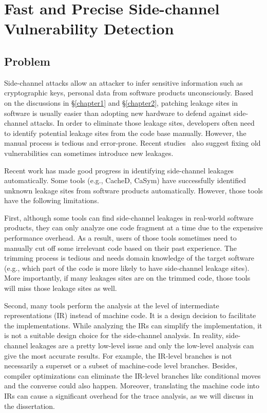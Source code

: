 
\chapter{Fast and Precise Side-channel Vulnerability Detection}\label{chapter3}
\section{Problem}
Side-channel attacks allow an attacker to infer sensitive information such as cryptographic keys, personal data from software products unconsciously. Based on the discussions in \S\ref{chapter1} and \S\ref{chapter2}, patching leakage sites in software is usually easier than adopting new hardware to defend against side-channel attacks. In order to eliminate those leakage sites, developers often need to identify potential leakage sites from the code base manually. However, the manual process is tedious and error-prone. Recent studies~\cite{203878} also suggest fixing old vulnerabilities can sometimes introduce new leakages.

Recent work has made good progress in identifying side-channel leakages automatically. Some tools (e.g., CacheD, CaSym) have successfully identified unknown leakage sites from software products automatically. However, those tools have the following limitations.

First, although some tools can find side-channel leakages in real-world software products, they can only analyze one code fragment at a time due to the expensive performance overhead. As a result, users of those tools sometimes need to manually cut off some irrelevant code based on their past experience. The trimming process is tedious and needs domain knowledge of the target software (e.g., which part of the code is more likely to have side-channel leakage sites). More importantly, if many leakages sites are on the trimmed code, those tools will miss those leakage sites as well.

Second, many tools perform the analysis at the level of intermediate representations (IR) instead of machine code. It is a design decision to facilitate the implementations. While analyzing the IRs can simplify the implementation, it is not a suitable design choice for the side-channel analysis. In reality, side-channel leakages are a pretty low-level issue and only the low-level analysis can give the most accurate results. For example, the IR-level branches is not necessarily a superset or a subset of machine-code level branches. Besides, compiler optimizations can eliminate the IR-level branches like conditional moves and the converse could also happen. Moreover, translating the machine code into IRs can cause a significant overhead for the trace analysis, as we will discuss in the dissertation.

